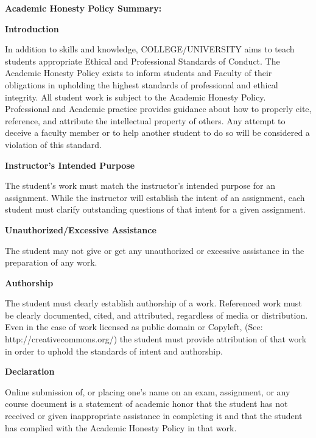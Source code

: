 \documentclass[11pt]{article}
\begin{document}
\textbf {\large Academic Honesty Policy Summary:} 

\textbf{Introduction}

\hspace{3mm}
\hangindent=5mm In addition to skills and knowledge, COLLEGE/UNIVERSITY aims to teach students appropriate Ethical and Professional Standards of Conduct. The Academic Honesty Policy exists to inform students and Faculty of their obligations in upholding the highest standards of professional and ethical integrity. All student work is subject to the Academic Honesty Policy. Professional and Academic practice provides guidance about how to properly cite, reference, and attribute the intellectual property of others. Any attempt to deceive a faculty member or to help another student to do so will be considered a violation of this standard.

\textbf{Instructor's Intended Purpose}

\hspace{3mm}
\hangindent=5mm The student's work must match the instructor's intended purpose for an assignment. While the instructor will establish the intent of an assignment, each student must clarify outstanding questions of that intent for a given assignment. 

\textbf{Unauthorized/Excessive Assistance}

\hspace{3mm}
\hangindent=5mm The student may not give or get any unauthorized or excessive assistance in the preparation of any work.

\textbf{Authorship}

\hspace{3mm}
\hangindent=5mm The student must clearly establish authorship of a work. Referenced work must be clearly documented, cited, and attributed, regardless of media or distribution. Even in the case of work licensed as public domain or Copyleft, (See: http://creativecommons.org/) the student must provide attribution of that work in order to uphold the standards of intent and authorship.

\textbf{Declaration}

\hspace{3mm}
\hangindent=5mm Online submission of, or placing one's name on an exam, assignment, or any course document is a statement of academic honor that the student has not received or given inappropriate assistance in completing it and that the student has complied with the Academic Honesty Policy in that work.
\end{document}

